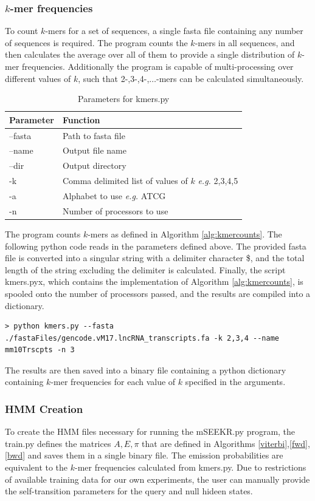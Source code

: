 \subsubsection{$k$-mer frequencies}
To count $k$-mers for a set of sequences, a single fasta file containing any number of sequences is required. The program counts the $k$-mers in all sequences, and then calculates the average over all of them to provide a single distribution of $k$-mer frequencies. Additionally the program is capable of multi-processing over different values of $k$, such that 2-,3-,4-,$\dots$-mers can be calculated simultaneously. 
\begin{table}[h]
\centering
 \begin{tabular}{|l l|}
 \hline
 Parameter & Function\\
 \hline
 --fasta & Path to fasta file \\
 --name & Output file name \\
 --dir & Output directory \\
 -k & Comma delimited list of values of $k$ \emph{e.g.} 2,3,4,5\\
 -a & Alphabet to use \emph{e.g.} ATCG\\
 -n & Number of processors to use\\
 \hline
 
\end{tabular}
\caption{Parameters for kmers.py}
\label{tab:kmerparams}
\end{table}

The program counts $k$-mers as defined in Algorithm \ref{alg:kmercounts}. The following python code reads in the parameters defined above. The provided fasta file is converted into a singular string with a delimiter character \$, and the total length of the string excluding the delimiter is calculated. Finally, the script kmers.pyx, which contains the implementation of Algorithm \ref{alg:kmercounts}, is spooled onto the number of processors passed, and the results are compiled into a dictionary. 

\begin{verbatim}
> python kmers.py --fasta ./fastaFiles/gencode.vM17.lncRNA_transcripts.fa -k 2,3,4 --name mm10Trscpts -n 3
\end{verbatim}

The results are then saved into a binary file containing a python dictionary containing $k$-mer frequencies for each value of $k$ specified in the arguments. 

\subsubsection{HMM Creation}
To create the HMM files necessary for running the mSEEKR.py program, the train.py defines the matrices $A,E,\pi$ that are defined in Algorithms \ref{viterbi},\ref{fwd},\ref{bwd} and saves them in a single binary file. The emission probabilities are equivalent to the $k$-mer frequencies calculated from kmers.py. Due to restrictions of available training data for our own experiments, the user can manually provide the self-transition parameters for the query and null hideen states.

